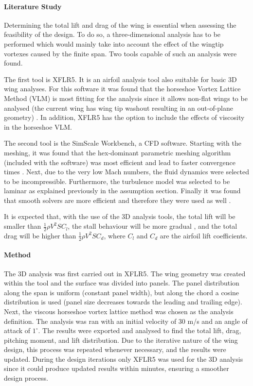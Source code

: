 \paragraph{Literature Study} Determining the total lift and drag of the wing is essential when assessing the feasibility of the design. To do so, a three-dimensional analysis has to be performed which would mainly take into account the effect of the wingtip vortexes caused by the finite span. Two tools capable of such an analysis were found.

The first tool is XFLR5. It is an airfoil analysis tool also suitable for basic 3D wing analyses. For this software it was found that the horseshoe Vortex Lattice Method (VLM) is most fitting for the analysis since it allows non-flat wings to be analysed (the current wing has wing tip washout resulting in an out-of-plane geometry) \cite[26]{xflr}. In addition, XFLR5 has the option to include the effects of viscosity in the horseshoe VLM.


The second tool is the SimScale Workbench, a CFD software. Starting with the meshing, it was found that the hex-dominant parametric meshing algorithm (included with the software) was most efficient and lead to faster convergence times \cite[9]{ansys}. Next, due to the very low Mach numbers, the fluid dynamics were selected to be incompressible. Furthermore, the turbulence model was selected to be laminar as explained previously in the assumption section. Finally it was found that smooth solvers are more efficient and therefore they were used as well \cite{iter}.

 It is expected that, with the use of the 3D analysis tools, the total lift will be smaller than $\frac{1}{2}\rho V^{2} S C_{l}$, the stall behaviour will be more gradual \cite[72]{ruijgrok}, and the total drag will be higher than $\frac{1}{2}\rho V^{2} S C_{d}$, where $C_{l}$ and $C_{d}$ are the airfoil lift coefficients.

\paragraph{Method} The 3D analysis was first carried out in XFLR5. The wing geometry was created within the tool and the surface was divided into panels. The panel distribution along the span is uniform (constant panel width), but along the chord a cosine distribution is used (panel size decreases towards the leading and trailing edge). Next, the viscous horseshoe vortex lattice method was chosen as the analysis definition. The analysis was ran with an initial velocity of 30 m/s and an angle of attack of $1^{\circ}$. The results were exported and analysed to find the total lift, drag, pitching moment, and lift distribution. Due to the iterative nature of the wing design, this process was repeated whenever necessary, and the results were updated. During the design iterations only XFLR5 was used for the 3D analysis since it could produce updated results within minutes, ensuring a smoother design process.

